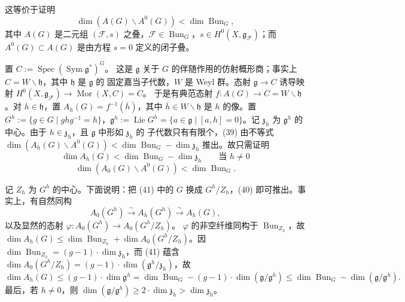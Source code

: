 
这等价于证明
\begin{equation}\tag{39}
  \dim(A(G)\backslash A^{0}(G))<\dim\operatorname{Bun}_G,
\end{equation}
其中 $A(G)$ 是二元组 $(\mathcal{F},s)$ 之叠，$\mathcal{F}\in
\operatorname{Bun}_G$，$s\in H^0(X,\mathfrak{g}_{\mathcal{F}})$；而
$A^{0}(G)\subset A(G)$ 是由方程 $s=0$ 定义的闭子叠。

置 $C:=\operatorname{Spec}(\operatorname{Sym}\mathfrak{g}^{*})^{G}$。
这是 $\mathfrak{g}$ 关于 $G$ 的伴随作用的仿射概形商；事实上
$C=W\backslash\mathfrak{h}$，其中 $\mathfrak{h}$ 是 $\mathfrak{g}$ 的
固定嘉当子代数，$W$ 是 Weyl 群。态射 $\mathfrak{g}\to C$ 诱导映射
$H^0(X,\mathfrak{g}_{\mathcal{F}})\to\operatorname{Mor}(X,C)=C$。
于是有典范态射 $f:A(G)\to C=W\backslash\mathfrak{h}$。对
$h\in\mathfrak{h}$，置 $A_h(G)=f^{-1}(\overline{h})$，其中
$\overline{h}\in W\backslash\mathfrak{h}$ 是 $h$ 的像。置
$G^{h}:=\{g\in G\mid ghg^{-1}=h\}$，$\mathfrak{g}^{h}:=
\operatorname{Lie}G^{h}=\{a\in\mathfrak{g}\mid[a,h]=0\}$。记
$\mathfrak{z}_h$ 为 $\mathfrak{g}^{h}$ 的中心。由于
$h\in\mathfrak{z}_h$，且 $\mathfrak{g}$ 中形如 $\mathfrak{z}_h$ 的
子代数只有有限个，(39) 由不等式
$\dim(A_h(G)\backslash A^{0}(G))
<\dim\operatorname{Bun}_G-\dim\mathfrak{z}_h$ 推出。故只需证明
\begin{equation}\tag{40}
  \dim A_h(G)<\dim\operatorname{Bun}_G-\dim\mathfrak{z}_h
  \qquad\text{当 } h\ne 0
\end{equation}
\begin{equation}\tag{41}
  \dim(A_0(G)\backslash A^{0}(G))<\dim\operatorname{Bun}_G.
\end{equation}

记 $Z_h$ 为 $G^{h}$ 的中心。下面说明：把 (41) 中的 $G$ 换成
$G^{h}/Z_h$，(40) 即可推出。事实上，有自然同构
\[
  A_0(G^{h})\xrightarrow{\sim}A_h(G^{h})\xrightarrow{\sim}A_h(G),
\]
以及显然的态射 $\varphi:A_0(G^{h})\to A_0(G^{h}/Z_h)$。
$\varphi$ 的非空纤维同构于 $\operatorname{Bun}_{Z_h}$，故
$\dim A_h(G)\le\dim\operatorname{Bun}_{Z_h}
+\dim A_0(G^{h}/Z_h)$。因
$\dim\operatorname{Bun}_{Z_h}=(g-1)\cdot\dim\mathfrak{z}_h$，而
(41) 蕴含 $\dim A_0(G^{h}/Z_h)
=(g-1)\cdot\dim(\mathfrak{g}^{h}/\mathfrak{z}_h)$，故
\[
  \dim A_h(G)\le(g-1)\cdot\dim\mathfrak{g}^{h}
  =\dim\operatorname{Bun}_G
  -(g-1)\cdot\dim(\mathfrak{g}/\mathfrak{g}^{h})
  \le\dim\operatorname{Bun}_G-\dim(\mathfrak{g}/\mathfrak{g}^{h}).
\]
最后，若 $h\ne 0$，则 $\dim(\mathfrak{g}/\mathfrak{g}^{h})
\ge 2\cdot\dim\mathfrak{z}_h>\dim\mathfrak{z}_h$。

